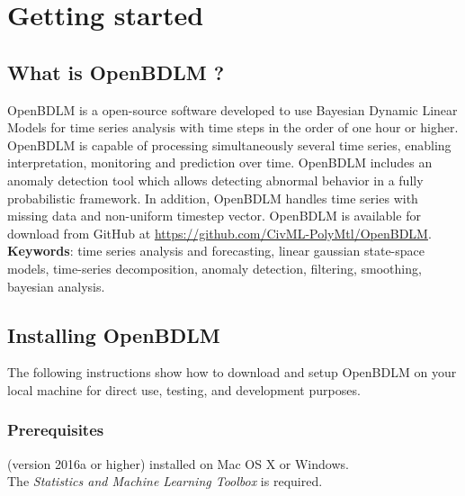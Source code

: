 \section{Getting started}

\subsection{What is OpenBDLM ?}
\label{S:OPENBDLMWHATIS}

OpenBDLM is a \MATLAB{} open-source software developed to use Bayesian Dynamic Linear Models for time series analysis with time steps in the order of one hour or higher.
OpenBDLM is capable of processing simultaneously several time series, enabling interpretation, monitoring and prediction over time.
OpenBDLM includes an anomaly detection tool which allows detecting abnormal behavior in a fully probabilistic framework.
In addition, OpenBDLM handles time series with missing data and non-uniform timestep vector.
OpenBDLM is available for download from GitHub at \url{https://github.com/CivML-PolyMtl/OpenBDLM}.\\

\noindent \textbf{Keywords}: time series analysis and forecasting, linear gaussian state-space models, time-series decomposition, anomaly detection, filtering, smoothing, bayesian analysis.

\subsection{Installing OpenBDLM}
\label{S:OPENBDLMINSTALLING}

The following instructions show how to download and setup OpenBDLM on your local machine for direct use, testing, and development purposes.
\subsubsection{Prerequisites}
\MATLAB{} (version 2016a or higher) installed on Mac OS X or Windows.\\

\noindent
The \MATLAB{}  \emph{Statistics and Machine Learning Toolbox} is required.

